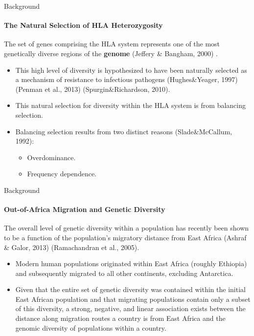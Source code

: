 \documentclass[pdftex,12pt,xcolor=pdftex,table]{beamer}
\theoremstyle{definition}
\theoremstyle{remark}
\numberwithin{equation}{section}
\numberwithin{figure}{section}
\begin{document}
\begin{frame}{Background}
\framesubtitle{The Natural Selection of HLA Heterozygosity}
\justifying
The set of genes comprising the HLA system represents one of the most genetically diverse regions of the \textbf{genome} (Jeffery \& Bangham, 2000) \cite{jeffery2000infectious}.
\pause
\begin{itemize}
    \item This high level of diversity is hypothesized to have been naturally selected as a mechanism of resistance to infectious pathogens (Hughes\&Yeager, 1997)\cite{hughes1998natural} (Penman et al., 2013)\cite{penman2013pathogen} (Spurgin\&Richardson, 2010)\cite{spurgin2010pathogens}.
    \pause
   \item This natural selection for diversity within the HLA system is from balancing selection.
   \pause
    \item Balancing selection results from two distinct reasons (Slade\&McCallum, 1992)\cite{slade1992overdominant}:
    \begin{itemize}
        \item Overdominance.
        \item Frequency dependence.

    \end{itemize}
\end{itemize}
\end{frame}

\begin{frame}{Background}
\framesubtitle{Out-of-Africa Migration and Genetic Diversity}
\justifying
The overall level of genetic diversity within a population has recently been shown to be a function of the population’s migratory distance from East Africa (Ashraf & Galor, 2013)\cite{ashraf2013out} (Ramachandran et al., 2005)\cite{ramachandran2005support}. 
\pause
\begin{itemize}
    \item Modern human populations originated within East Africa (roughly Ethiopia) and subsequently migrated to all other continents, excluding Antarctica.
    \pause
    \item Given that the entire set of genetic diversity was contained within the initial East African population and that migrating populations contain only a subset of this diversity, a strong, negative, and linear association exists between the distance along migration routes a country is from East Africa and the genomic diversity of populations within a country.
\end{itemize}
\end{frame}
\end{document}
